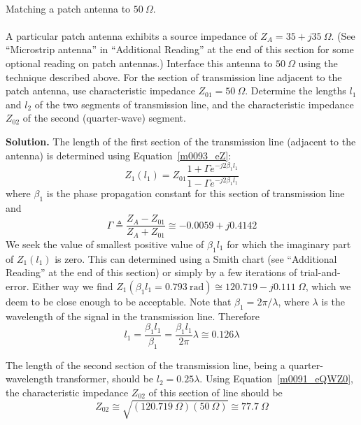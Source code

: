 ~\\ \begin{example} 
\begin{mdframed}[backgroundcolor=brown!20,linecolor=brown!20]\raggedright
Matching a patch antenna 
to $50~\Omega$.
\\~\\
A particular patch antenna exhibits a source impedance of $Z_A = 35+j35~\Omega$. 
(See ``Microstrip antenna'' in ``Additional Reading'' at the end of this section for some optional reading on patch antennas.) 
Interface this antenna to $50~\Omega$ using the technique described above.
For the section of transmission line adjacent to the patch antenna, use characteristic impedance $Z_{01}=50~\Omega$.
Determine the lengths $l_1$ and $l_2$ of the two segments of transmission line, and the characteristic impedance $Z_{02}$ of the second (quarter-wave) segment. 

{\bf Solution.}
The length of the first section of the transmission line (adjacent to the antenna) is determined using Equation~\ref{m0093_eZ}:
%
\begin{equation}
Z_1(l_1) = Z_{01} \frac{ 1 + \Gamma e^{-j2\beta_1 l_1} }{  1 - \Gamma e^{-j2\beta_1 l_1} }
\end{equation}
%
where $\beta_1$ is the phase propagation constant for this section of transmission line and 
%
\begin{equation}
\Gamma \triangleq \frac{Z_A-Z_{01}}{Z_A+Z_{01}} \cong -0.0059+j0.4142
\end{equation}
%
We seek the value of smallest positive value of $\beta_1 l_1$ for which the imaginary part of $Z_1(l_1)$ is zero.
This can determined using a Smith chart  (see ``Additional Reading'' at the end of this section) or simply by a few iterations of trial-and-error.
Either way we find $Z_1(\beta_1 l_1 = 0.793~\mbox{rad}) \cong 120.719-j0.111~\Omega$, which we deem to be close enough to be acceptable.
Note that $\beta_1 = 2\pi/\lambda$, where $\lambda$ is the wavelength of the signal in the transmission line.
Therefore 
%
\begin{equation}
l_1 
= \frac{\beta_1 l_1}{\beta_1} 
= \frac{\beta_1 l_1}{2\pi} \lambda 
\cong 0.126\lambda
\end{equation} 

The length of the second section of the transmission line, being a quarter-wavelength transformer, should be $l_2 = 0.25\lambda$.
Using Equation~\ref{m0091_eQWZ0}, the characteristic impedance $Z_{02}$ of this section of line should be
%
\begin{equation}
Z_{02} \cong \sqrt{\left(120.719~\Omega\right) \left(50~\Omega\right) } \cong 77.7~\Omega
\end{equation}


\end{mdframed}
\end{example}

